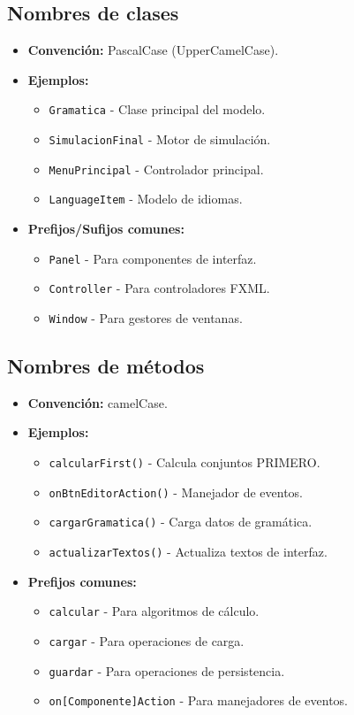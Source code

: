 \subsection{Nombres de clases}

\begin{itemize}
    \item \textbf{Convención:} PascalCase (UpperCamelCase).
    \item \textbf{Ejemplos:}
    \begin{itemize}
        \item \texttt{Gramatica} - Clase principal del modelo.
        \item \texttt{SimulacionFinal} - Motor de simulación.
        \item \texttt{MenuPrincipal} - Controlador principal.
        \item \texttt{LanguageItem} - Modelo de idiomas.
    \end{itemize}
    \item \textbf{Prefijos/Sufijos comunes:}
    \begin{itemize}
        \item \texttt{Panel} - Para componentes de interfaz.
        \item \texttt{Controller} - Para controladores FXML.
        \item \texttt{Window} - Para gestores de ventanas.
    \end{itemize}
\end{itemize}

\subsection{Nombres de métodos}

\begin{itemize}
    \item \textbf{Convención:} camelCase.
    \item \textbf{Ejemplos:}
    \begin{itemize}
        \item \texttt{calcularFirst()} - Calcula conjuntos PRIMERO.
        \item \texttt{onBtnEditorAction()} - Manejador de eventos.
        \item \texttt{cargarGramatica()} - Carga datos de gramática.
        \item \texttt{actualizarTextos()} - Actualiza textos de interfaz.
    \end{itemize}
    \item \textbf{Prefijos comunes:}
    \begin{itemize}
        \item \texttt{calcular} - Para algoritmos de cálculo.
        \item \texttt{cargar} - Para operaciones de carga.
        \item \texttt{guardar} - Para operaciones de persistencia.
        \item \texttt{on[Componente]Action} - Para manejadores de eventos.
    \end{itemize}
\end{itemize}

